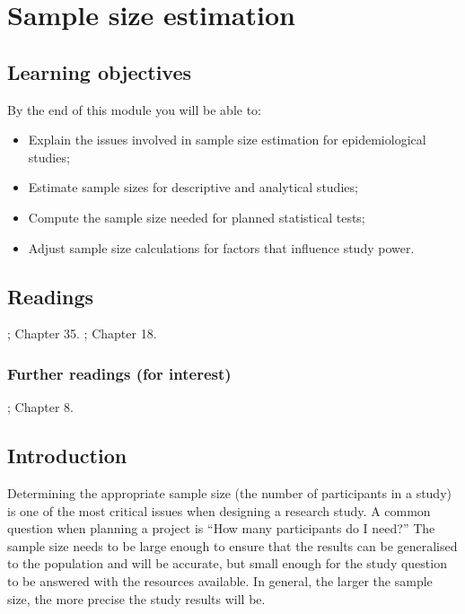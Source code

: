 \documentclass[
]{memoir}
\providecommand{\tightlist}{%
  \setlength{\itemsep}{0pt}\setlength{\parskip}{0pt}}
\begin{document}
\hypertarget{sample-size-estimation}{%
\chapter{Sample size estimation}\label{sample-size-estimation}}

\hypertarget{learning-objectives-9}{%
\section*{Learning objectives}\label{learning-objectives-9}}

By the end of this module you will be able to:

\begin{itemize}
\tightlist
\item
  Explain the issues involved in sample size estimation for epidemiological studies;
\item
  Estimate sample sizes for descriptive and analytical studies;
\item
  Compute the sample size needed for planned statistical tests;
\item
  Adjust sample size calculations for factors that influence study power.
\end{itemize}

\hypertarget{readings-9}{%
\section*{Readings}\label{readings-9}}

\citet{kirkwood_sterne01}; Chapter 35.
\citet{bland15}; Chapter 18.

\hypertarget{further-readings-for-interest}{%
\subsection*{Further readings (for interest)}\label{further-readings-for-interest}}

\citet{woodward13}; Chapter 8.

\hypertarget{introduction-8}{%
\section{Introduction}\label{introduction-8}}

Determining the appropriate sample size (the number of participants in a study) is one of the most critical issues when designing a research study. A common question when planning a project is ``How many participants do I need?'' The sample size needs to be large enough to ensure that the results can be generalised to the population and will be accurate, but small enough for the study question to be answered with the resources available. In general, the larger the sample size, the more precise the study results will be.
\end{document}
